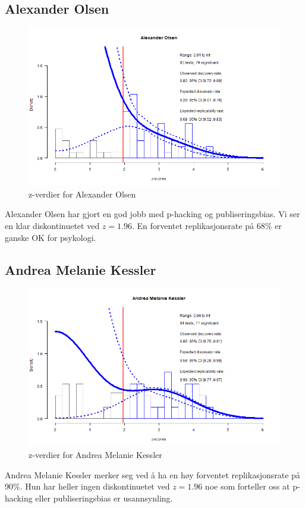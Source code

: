 \documentclass[doc,norsk]{apa7}
\begin{document}



\subsection{Alexander Olsen}
\begin{figure}[h!]
    \centering
    \includegraphics[width=\textwidth]{images/Alexander Olsen.png}
    \caption{z-verdier for Alexander Olsen}
\end{figure}
Alexander Olsen har gjort en god jobb med p-hacking og publiseringsbias. Vi ser en klar diskontinuetet ved $z=1.96$. En forventet replikasjonsrate på 68\% er ganske OK for psykologi.

\subsection{Andrea Melanie Kessler}
\begin{figure}[h!]
    \centering
    \includegraphics[width=\textwidth]{images/Andrea Melanie Kessler.png}
    \caption{z-verdier for Andrea Melanie Kessler}
\end{figure}
Andrea Melanie Kessler merker seg ved å ha en høy forventet replikasjonsrate på 90\%. Hun har heller ingen diskontinuetet ved $z=1.96$ noe som forteller oss at p-hacking eller publiseringsbias er usannsynling.
\end{document}
